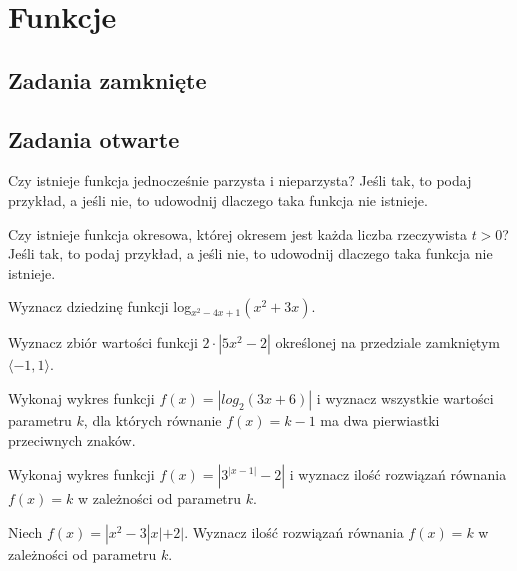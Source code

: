 \setcounter{parc}{0}
\addtocounter{chapc}{1}

\chapter{Funkcje}

\section{Zadania zamknięte}

\section{Zadania otwarte}

\zadanie Czy istnieje funkcja jednocześnie parzysta i nieparzysta? Jeśli tak, to podaj przykład, a jeśli nie, to udowodnij dlaczego taka funkcja nie istnieje.

\zadanie Czy istnieje funkcja okresowa, której okresem jest każda liczba rzeczywista $t > 0$? Jeśli tak, to podaj przykład, a jeśli nie, to udowodnij dlaczego taka funkcja nie istnieje.

\zadanie Wyznacz dziedzinę funkcji log$_{x^2 - 4x + 1}(x^2 + 3x)$.

\zadanie Wyznacz zbiór wartości funkcji $2\cdot|5x^2 - 2|$ określonej na przedziale zamkniętym $\langle -1, 1 \rangle$.

\zadanie Wykonaj wykres funkcji $f(x) = |log_2(3x + 6)|$ i wyznacz wszystkie wartości parametru $k$, dla których równanie $f(x) = k - 1$ ma dwa pierwiastki przeciwnych znaków.

\zadanie Wykonaj wykres funkcji $f(x) = |3^{|x - 1|} - 2|$ i wyznacz ilość rozwiązań równania $f(x) = k$ w zależności od parametru $k$.

\zadanie Niech $f(x) = |x^2 -3|x| + 2|$. Wyznacz ilość rozwiązań równania $f(x) = k$ w zależności od parametru $k$.